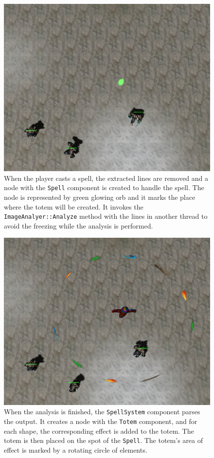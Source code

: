 \begin{figure}[p]
\centering
\includegraphics[width=.6\linewidth]{ext/scr/komix4.png}
\caption{When the player casts a spell, the extracted lines are removed and a node with the \texttt{Spell} component is created to handle the spell.  The node is represented by green glowing orb and it marks the place where the totem will be created. It invokes the \texttt{ImageAnalyer::Analyze} method with the lines in another thread to avoid the freezing while the analysis is performed. }
\label{fig:orb}
\end{figure}

\begin{figure}[p]
\centering
\includegraphics[width=.6\linewidth]{ext/scr/komix5.png}
\caption{When the analysis is finished, the \texttt{SpellSystem} component parses the output. It creates a node with the \texttt{Totem} component, and for each shape, the corresponding effect is added to the totem. The totem is then placed on the spot of the \texttt{Spell}. The totem's area of effect is marked by a rotating circle of elements. }
\label{fig:totem}
\end{figure}

